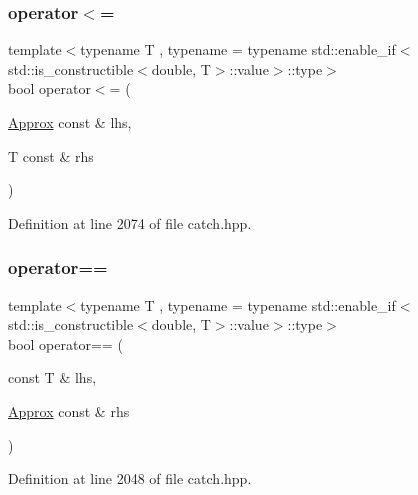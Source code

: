 \subsubsection{\texorpdfstring{operator$<$=}{operator<=}\hspace{0.1cm}{\footnotesize\ttfamily [2/2]}}
{\footnotesize\ttfamily template$<$typename T , typename  = typename std\+::enable\+\_\+if$<$std\+::is\+\_\+constructible$<$double, T$>$\+::value$>$\+::type$>$ \\
bool operator$<$= (\begin{DoxyParamCaption}\item[{\mbox{\hyperlink{class_catch_1_1_detail_1_1_approx}{Approx}} const \&}]{lhs,  }\item[{T const \&}]{rhs }\end{DoxyParamCaption})\hspace{0.3cm}{\ttfamily [friend]}}



Definition at line 2074 of file catch.\+hpp.

\mbox{\label{class_catch_1_1_detail_1_1_approx_ab38782a37d09b527ca5e126dbf433dda}} 
\subsubsection{\texorpdfstring{operator==}{operator==}\hspace{0.1cm}{\footnotesize\ttfamily [1/2]}}
{\footnotesize\ttfamily template$<$typename T , typename  = typename std\+::enable\+\_\+if$<$std\+::is\+\_\+constructible$<$double, T$>$\+::value$>$\+::type$>$ \\
bool operator== (\begin{DoxyParamCaption}\item[{const T \&}]{lhs,  }\item[{\mbox{\hyperlink{class_catch_1_1_detail_1_1_approx}{Approx}} const \&}]{rhs }\end{DoxyParamCaption})\hspace{0.3cm}{\ttfamily [friend]}}



Definition at line 2048 of file catch.\+hpp.

\mbox{\label{class_catch_1_1_detail_1_1_approx_a0e5ef1957d4c38d7857005909c613743}} 
